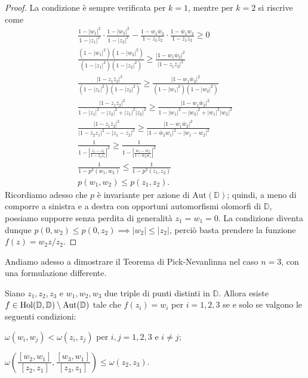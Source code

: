\begin{proof}
  La condizione è sempre verificata per $k=1$, mentre per $k=2$ si riscrive come
  \begin{gather*}
    \frac{1-|w_1|^2}{1-|z_1|^2}\cdot\frac{1-|w_2|^2}{1-|z_2|^2}-\frac{1-w_1\bar{w}_2}{1-z_1\bar{z}_2}\cdot\frac{1-\bar{w}_1w_2}{1-\bar{z}_1z_2} \ge 0 \\
    \frac{(1-|w_1|^2)(1-|w_2|^2)}{(1-|z_1|^2)(1-|z_2|^2)} \ge \frac{|1-w_1\bar{w}_2|^2}{|1-z_1\bar{z}_2|^2} \\
    \frac{|1-z_1\bar{z}_2|^2}{(1-|z_1|^2)(1-|z_2|^2)} \ge \frac{|1-w_1\bar{w}_2|^2}{(1-|w_1|^2)(1-|w_2|^2)} \\
    \frac{|1-z_1\bar{z}_2|^2}{1-|z_1|^2-|z_2|^2+|z_1|^2|z_2|^2} \ge \frac{|1-w_1\bar{w}_2|^2}{1-|w_1|^2-|w_2|^2+|w_1|^2|w_2|^2} \\
    \frac{|1-z_1\bar{z}_2|^2}{|1-\bar{z}_2z_1|^2-|z_1-z_2|^2} \ge \frac{|1-w_1\bar{w}_2|^2}{|1-\bar{w}_2w_1|^2-|w_1-w_2|^2} \\
    \frac{1}{1-\left|\frac{z_1-z_2}{1-\bar{z}_2z_1}\right|^2} \ge \frac{1}{1-\left|\frac{w_1-w_2}{1-\bar{w}_2w_1}\right|^2} \\
    \frac{1}{1-p^2(w_1,w_2)} \le \frac{1}{1-p^2(z_1,z_2)} \\
    p(w_1,w_2) \le p(z_1,z_2).
  \end{gather*}
  Ricordiamo adesso che $p$ è invariante per azione di $\text{Aut}(\mathbb{D})$; quindi, a meno di comporre a sinistra e a destra con opportuni automorfismi olomorfi di $\mathbb{D}$, possiamo supporre senza perdita di generalità $z_1=w_1=0$. La condizione diventa dunque $p(0,w_2) \le p(0,z_2) \implies |w_2| \le |z_2|$, perciò basta prendere la funzione $f(z)=w_2z/z_2$.
\end{proof}

Andiamo adesso a dimostrare il Teorema di Pick-Nevanlinna nel caso $n=3$, con una formulazione differente.

\begin{thm}
  Siano $z_1, z_2, z_3$ e $w_1, w_2, w_3$ due triple di punti distinti in $\mathbb{D}$. Allora esiste $f \in \normalfont{\text{Hol}}(\mathbb{D},\mathbb{D}) \setminus \normalfont{\text{Aut}}(\mathbb{D})$ tale che $f(z_i)=w_i$ per $i=1,2,3$ se e solo se valgono le seguenti condizioni:
  \begin{nlist}
    \item $\omega(w_i,w_j)<\omega(z_i,z_j)$ per $i,j=1,2,3$ e $i\not=j$;
    \item $\omega\left(\dfrac{[w_2,w_1]}{[z_2,z_1]},\dfrac{[w_3,w_1]}{[z_3,z_1]}\right) \le \omega(z_2,z_3)$.
  \end{nlist}
\end{thm}

